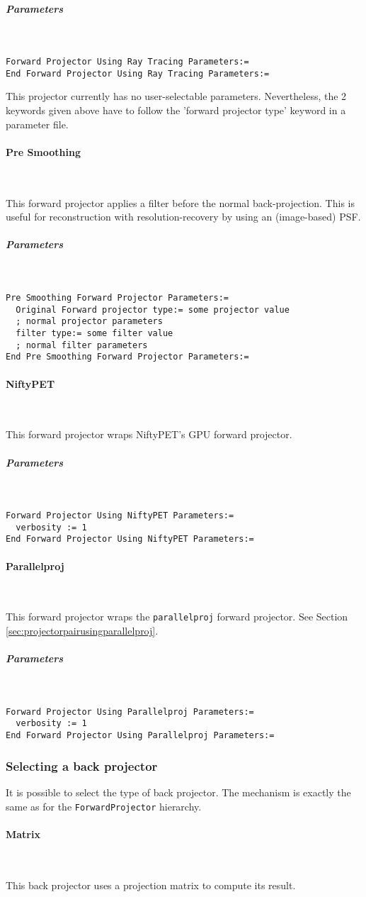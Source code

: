 \documentclass{article}
\newcommand{\subsubsubsection}[1]{\paragraph{#1}\mbox{} \\}
\newcommand{\subsubsubsubsection}[1]{\subparagraph{#1} \mbox{} \\}
\begin{document}
{{{ \subsubsubsubsection{Parameters}
}
\begin{verbatim}
Forward Projector Using Ray Tracing Parameters:=
End Forward Projector Using Ray Tracing Parameters:=
\end{verbatim}

This projector currently has no user-selectable parameters. Nevertheless, 
the 2 keywords given above have to follow the 'forward projector 
type' keyword in a parameter file.

{ \subsubsubsection{Pre Smoothing}
}
This forward projector applies a filter before the normal back-projection.
This is useful for reconstruction with resolution-recovery 
by using an (image-based) PSF.

{ \subsubsubsubsection{Parameters}
}
\begin{verbatim}
Pre Smoothing Forward Projector Parameters:=
  Original Forward projector type:= some projector value 
  ; normal projector parameters
  filter type:= some filter value
  ; normal filter parameters
End Pre Smoothing Forward Projector Parameters:=
\end{verbatim}

{ \subsubsubsection{NiftyPET}
}
This forward projector wraps NiftyPET's GPU forward projector.

{ \subsubsubsubsection{Parameters}
}
\begin{verbatim}
Forward Projector Using NiftyPET Parameters:=
  verbosity := 1
End Forward Projector Using NiftyPET Parameters:=
\end{verbatim}

{ \subsubsubsection{Parallelproj}
}
This forward projector wraps the \texttt{parallelproj} forward projector.
See Section \ref{sec:projectorpairusingparallelproj}.

{ \subsubsubsubsection{Parameters}
}
\begin{verbatim}
Forward Projector Using Parallelproj Parameters:=
  verbosity := 1
End Forward Projector Using Parallelproj Parameters:=
\end{verbatim}

\subsubsection{
Selecting a back projector}
\label{sec:backprojectors}
It is possible to select the type of back projector. The mechanism 
is exactly the same as for the \texttt{ForwardProjector} hierarchy.

{ \subsubsubsection{Matrix}
}
This back projector uses a projection matrix to compute its result.

}}
\end{document}
